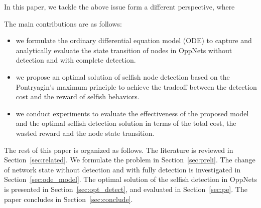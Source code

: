In this paper, we tackle the above issue
form a different perspective, where




The main contributions are as follows:

\begin{itemize}
\item {we formulate the ordinary differential equation model (ODE)
to capture and analytically evaluate the state transition of nodes
in OppNets without detection and with complete detection.}
\item {we propose an optimal solution of selfish node detection
based on the Pontryagin's maximum principle
to achieve the tradeoff between the detection cost
and the reward of selfish behaviors.}
\item {we conduct experiments to evaluate
the effectiveness of the proposed model
and the optimal selfish detection solution
in terms of the total cost, the wasted reward and the node state transition.}
\end{itemize}

The rest of this paper is organized as follows.
The literature is reviewed in Section~\ref{sec:related}.
We formulate the problem in Section~\ref{sec:preli}.
The change of network state without detection and with fully detection
is investigated in Section~\ref{sec:ode_model}.
The optimal solution of the selfish detection in OppNets
is presented in Section~\ref{sec:opt_detect},
and evaluated in Section~\ref{sec:pe}.
The paper concludes in Section~\ref{sec:conclude}.